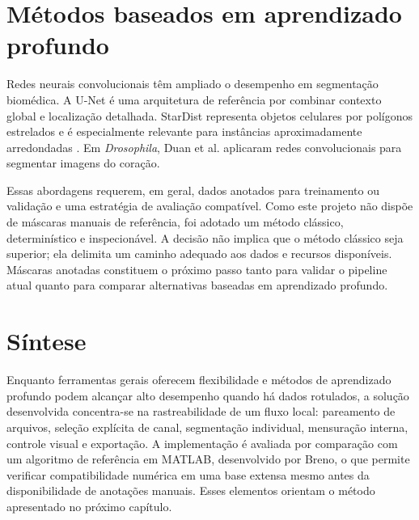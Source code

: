 \section{Métodos baseados em aprendizado profundo}

Redes neurais convolucionais têm ampliado o desempenho em segmentação biomédica. A U-Net \cite{Ronneberger2015} é uma arquitetura de referência por combinar contexto global e localização detalhada. StarDist representa objetos celulares por polígonos estrelados e é especialmente relevante para instâncias aproximadamente arredondadas \cite{Schmidt2018}. Em \textit{Drosophila}, Duan et al. \cite{Duan2018} aplicaram redes convolucionais para segmentar imagens do coração.

Essas abordagens requerem, em geral, dados anotados para treinamento ou validação e uma estratégia de avaliação compatível. Como este projeto não dispõe de máscaras manuais de referência, foi adotado um método clássico, determinístico e inspecionável. A decisão não implica que o método clássico seja superior; ela delimita um caminho adequado aos dados e recursos disponíveis. Máscaras anotadas constituem o próximo passo tanto para validar o pipeline atual quanto para comparar alternativas baseadas em aprendizado profundo.

\section{Síntese}

Enquanto ferramentas gerais oferecem flexibilidade e métodos de aprendizado profundo podem alcançar alto desempenho quando há dados rotulados, a solução desenvolvida concentra-se na rastreabilidade de um fluxo local: pareamento de arquivos, seleção explícita de canal, segmentação individual, mensuração interna, controle visual e exportação. A implementação é avaliada por comparação com um algoritmo de referência em MATLAB, desenvolvido por Breno, o que permite verificar compatibilidade numérica em uma base extensa mesmo antes da disponibilidade de anotações manuais. Esses elementos orientam o método apresentado no próximo capítulo.
